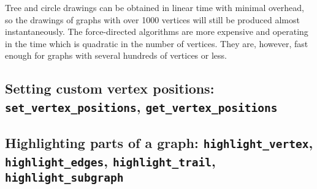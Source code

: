 \documentclass[a4paper,11pt]{article}
\begin{document}
Tree and circle drawings can be obtained in linear time with minimal overhead, so the drawings of graphs with over 1000 vertices will still be produced almost instantaneously. The force-directed algorithms are more expensive and operating in the time which is quadratic in the number of vertices. They are, however, fast enough for graphs with several hundreds of vertices or less.

\subsection{Setting custom vertex positions: {\tt set\_vertex\_positions}, {\tt get\_vertex\_positions}}

\subsection{Highlighting parts of a graph: {\tt highlight\_vertex}, {\tt highlight\_edges}, {\tt highlight\_trail}, {\tt highlight\_subgraph}}
\end{document}
